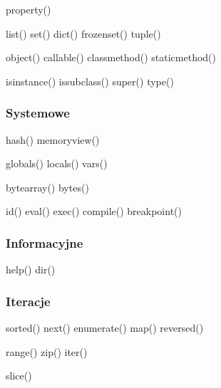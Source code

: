 \documentclass[a4paper]{article}
\begin{document}
property()

list()
set()
dict()
frozenset()
tuple()

object()
callable()
classmethod()
staticmethod()

isinstance()
issubclass()
super()
type()

\subsubsection*{Systemowe}
hash()
memoryview()

globals()
locals()
vars()

bytearray()
bytes()


id()
eval()
exec()
compile()
breakpoint()

\subsubsection*{Informacyjne}
help()
dir()

\subsubsection*{Iteracje}
sorted()
next()
enumerate()
map()
reversed()

range()
zip()
iter()

slice()
\end{document}
